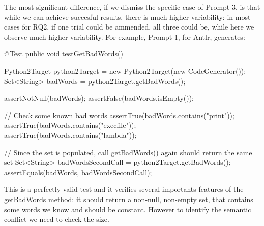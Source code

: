 The most significant difference, if we dismiss the specific case of Prompt 3, is that while we can achieve succesful results,
there is much higher variability: in most cases for RQ2, if one trial could be ammended, all three could be, while here we observe much
higher variability. For example, Prompt 1, for Antlr, generates:
\begin{response}
    @Test
    public void testGetBadWords() {
        Python2Target python2Target = new Python2Target(new CodeGenerator());
        Set<String> badWords = python2Target.getBadWords();

        assertNotNull(badWords);
        assertFalse(badWords.isEmpty());

        // Check some known bad words
        assertTrue(badWords.contains("print"));
        assertTrue(badWords.contains("execfile"));
        assertTrue(badWords.contains("lambda"));

        // Since the set is populated, call getBadWords() again should return the same set
        Set<String> badWordsSecondCall = python2Target.getBadWords();
        assertEquals(badWords, badWordsSecondCall);
    }
\end{response}
This is a perfectly valid test and it verifies several importants features of the getBadWords method: it should
return a non-null, non-empty set, that contains some words we know and should be constant. However to identify the semantic
conflict we need to check the size.

